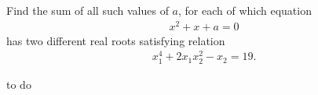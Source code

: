 Find the sum of all such values of $a$, for each of which equation
\begin{align*}
x^{2} + x + a = 0
\end{align*}
has two different real roots satisfying relation
\begin{align*}
x_{1}^{4} + 2x_{1}x_{2}^{2} - x_{2} = 19.
\end{align*}

\begin{answer}
to do
\end{answer}
